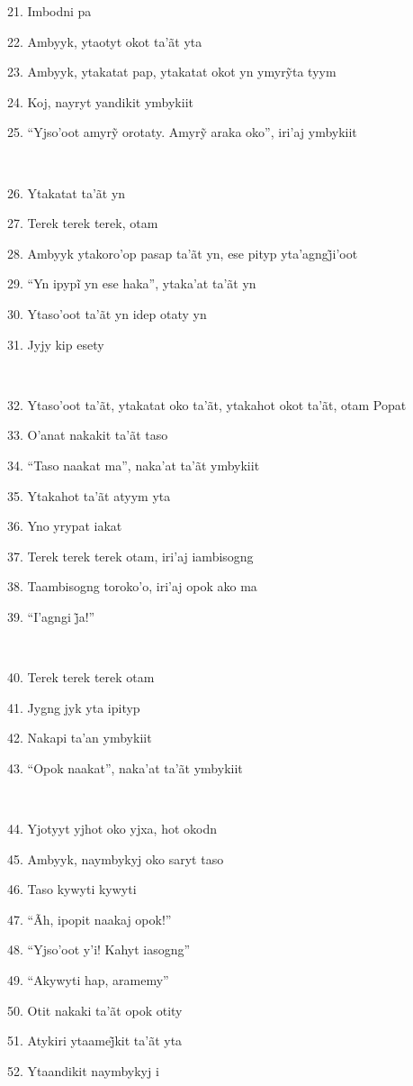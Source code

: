 21. Imbodni pa

22. Ambyyk, ytaotyt okot ta'ãt yta

23. Ambyyk, ytakatat pap, ytakatat okot yn ymyrỹta tyym

24. Koj, nayryt yandikit ymbykiit

25. ``Yjso’oot amyrỹ orotaty. Amyrỹ araka oko'', iri’aj ymbykiit

~

26. Ytakatat ta'ãt yn

27. Terek terek terek, otam

28. Ambyyk ytakoro’op pasap ta’ãt yn, ese pityp yta’agngj̃i’oot

29. ``Yn ipypĩ yn ese haka'', ytaka’at ta’ãt yn

30. Ytaso'oot ta'ãt yn idep otaty yn

31. Jyjy kip esety

~

32. Ytaso'oot ta'ãt, ytakatat oko ta'ãt, ytakahot okot ta'ãt, otam Popat

33. O'anat nakakit ta'ãt taso

34. ``Taso naakat ma'', naka'at ta'ãt ymbykiit

35. Ytakahot ta'ãt atyym yta

36. Yno yrypat iakat

37. Terek terek terek otam, iri'aj iambisogng

38. Taambisogng toroko'o, iri'aj opok ako ma

39. ``I’agngi j̃a!''

~

40. Terek terek terek otam

41. Jygng jyk yta ipityp

42. Nakapi ta'an ymbykiit

43. ``Opok naakat'', naka'at ta'ãt ymbykiit

~

44. Yjotyyt yjhot oko yjxa, hot okodn

45. Ambyyk, naymbykyj oko saryt taso

46. Taso kywyti kywyti

47. ``Ãh, ipopit naakaj opok!''

48. ``Yjso'oot y'i! Kahyt iasogng''

49. ``Akywyti hap, aramemy''

50. Otit nakaki ta'ãt opok otity

51. Atykiri ytaamej̃kit ta’ãt yta

52. Ytaandikit naymbykyj i

